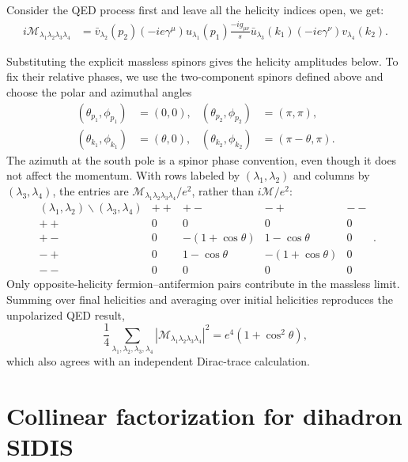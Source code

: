 \documentclass[a4paper,11pt]{article}
\newcommand{\nn}{\nonumber}
\begin{document}
Consider the QED process first and leave all the helicity indices open, we get:
\begin{align}
    i\mathcal{M}_{\lambda_1\lambda_2\lambda_3\lambda_4} &= \bar{v}_{\lambda_2}(p_2) (-ie\gamma^\mu) u_{\lambda_1}(p_1) \frac{-i g_{\mu\nu}}{s} \bar{u}_{\lambda_3}(k_1) (-ie\gamma^\nu) v_{\lambda_4}(k_2).
\end{align}

Substituting the explicit massless spinors gives the helicity amplitudes below.
To fix their relative phases, we use the two-component spinors defined above and choose the polar and azimuthal angles
\begin{align}
    (\theta_{p_1},\phi_{p_1}) &= (0,0), &
    (\theta_{p_2},\phi_{p_2}) &= (\pi,\pi), \nn\\
    (\theta_{k_1},\phi_{k_1}) &= (\theta,0), &
    (\theta_{k_2},\phi_{k_2}) &= (\pi-\theta,\pi).
\end{align}
The azimuth at the south pole is a spinor phase convention, even though it does not affect the momentum.
With rows labeled by $(\lambda_1,\lambda_2)$ and columns by $(\lambda_3,\lambda_4)$, the entries are $\mathcal{M}_{\lambda_1\lambda_2\lambda_3\lambda_4}/e^2$, rather than $i\mathcal{M}/e^2$:
\begin{equation}
\label{eq:qed-helicity-amplitudes}
    \begin{array}{c|cccc}
        (\lambda_1,\lambda_2)\backslash(\lambda_3,\lambda_4)
            & ++ & +- & -+ & -- \\ \hline
        ++  & 0 & 0 & 0 & 0 \\
        +-  & 0 & -(1+\cos\theta) & 1-\cos\theta & 0 \\
        -+  & 0 & 1-\cos\theta & -(1+\cos\theta) & 0 \\
        --  & 0 & 0 & 0 & 0
    \end{array}.
\end{equation}
Only opposite-helicity fermion--antifermion pairs contribute in the massless limit.
Summing over final helicities and averaging over initial helicities reproduces the unpolarized QED result,
\begin{equation}
\label{eq:qed-helicity-spin-sum}
    \frac{1}{4}\sum_{\lambda_1,\lambda_2,\lambda_3,\lambda_4}
    \left|\mathcal{M}_{\lambda_1\lambda_2\lambda_3\lambda_4}\right|^2
    = e^4\left(1+\cos^2\theta\right),
\end{equation}
which also agrees with an independent Dirac-trace calculation.

\section{Collinear factorization for dihadron SIDIS}
\label{sec:sidis-factorization}
\end{document}
